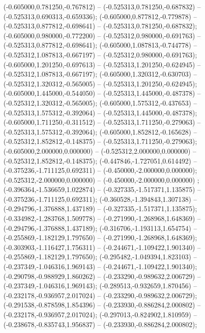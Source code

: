  (-0.605000,0.781250,-0.767812) -- (-0.525313,0.781250,-0.687832) -- (-0.525313,0.690313,-0.659336);
 (-0.605000,0.877812,-0.779878) -- (-0.525313,0.877812,-0.698641) -- (-0.525313,0.781250,-0.687832);
 (-0.605000,0.980000,-0.772200) -- (-0.525312,0.980000,-0.691763) -- (-0.525313,0.877812,-0.698641);
 (-0.605000,1.087813,-0.744778) -- (-0.525312,1.087813,-0.667197) -- (-0.525312,0.980000,-0.691763);
 (-0.605000,1.201250,-0.697613) -- (-0.525313,1.201250,-0.624945) -- (-0.525312,1.087813,-0.667197);
 (-0.605000,1.320312,-0.630703) -- (-0.525312,1.320312,-0.565005) -- (-0.525313,1.201250,-0.624945);
 (-0.605000,1.445000,-0.544050) -- (-0.525313,1.445000,-0.487378) -- (-0.525312,1.320312,-0.565005);
 (-0.605000,1.575312,-0.437653) -- (-0.525313,1.575312,-0.392064) -- (-0.525313,1.445000,-0.487378);
 (-0.605000,1.711250,-0.311512) -- (-0.525313,1.711250,-0.279063) -- (-0.525313,1.575312,-0.392064);
 (-0.605000,1.852812,-0.165628) -- (-0.525312,1.852812,-0.148375) -- (-0.525313,1.711250,-0.279063);
 (-0.605000,2.000000,0.000000) -- (-0.525312,2.000000,0.000000) -- (-0.525312,1.852812,-0.148375);
 (-0.447846,-1.727051,0.614492) -- (-0.375236,-1.711125,0.692311) -- (-0.450000,-2.000000,0.000000);
 (-0.525312,-2.000000,0.000000) -- (-0.450000,-2.000000,0.000000) ;
 (-0.396364,-1.536659,1.022874) -- (-0.327335,-1.517371,1.135875) -- (-0.375236,-1.711125,0.692311);
 (-0.360528,-1.394843,1.307138) -- (-0.294796,-1.376888,1.437189) -- (-0.327335,-1.517371,1.135875);
 (-0.334982,-1.283768,1.509778) -- (-0.271990,-1.268968,1.648369) -- (-0.294796,-1.376888,1.437189);
 (-0.316706,-1.193113,1.654754) -- (-0.255869,-1.182129,1.797650) -- (-0.271990,-1.268968,1.648369);
 (-0.303903,-1.116427,1.756311) -- (-0.244671,-1.109422,1.901340) -- (-0.255869,-1.182129,1.797650);
 (-0.295482,-1.049394,1.823103) -- (-0.237349,-1.046316,1.969143) -- (-0.244671,-1.109422,1.901340);
 (-0.290798,-0.988929,1.860262) -- (-0.233290,-0.989632,2.006729) -- (-0.237349,-1.046316,1.969143);
 (-0.289513,-0.932659,1.870456) -- (-0.232178,-0.936957,2.017024) -- (-0.233290,-0.989632,2.006729);
 (-0.291538,-0.878598,1.854396) -- (-0.233930,-0.886284,2.000802) -- (-0.232178,-0.936957,2.017024);
 (-0.297013,-0.824902,1.810959) -- (-0.238678,-0.835743,1.956837) -- (-0.233930,-0.886284,2.000802);
